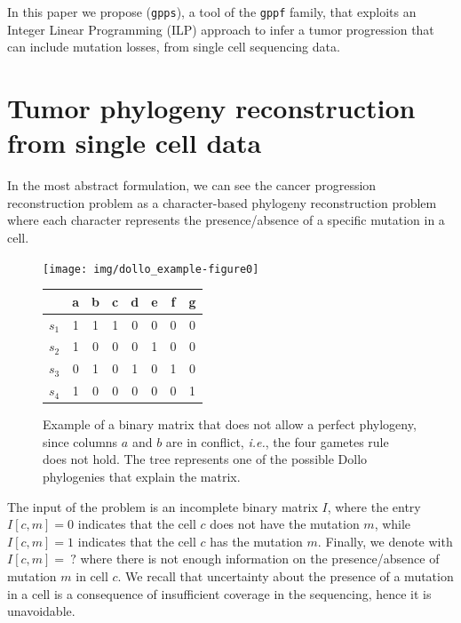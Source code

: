 \documentclass[a4paper,USenglish]{article}
\newcommand{\ie}{\emph{i.e.}}
\theoremstyle{definition}
\begin{document}
In this paper we propose (\texttt{gpps}), a tool of the \texttt{gppf}
family, that exploits an Integer Linear Programming (ILP) approach to
infer a tumor progression that can include mutation losses, from
single cell sequencing data.

\section{Tumor phylogeny reconstruction from single cell data}

In the most abstract formulation, we can see the cancer progression
reconstruction problem as a character-based phylogeny reconstruction
problem~\cite{Gusfield} where each character represents the
presence/absence of a specific mutation in a cell.

\begin{figure}[tb!]
  \begin{minipage}[c]{0.55\textwidth}
    \texttt{[image: img/dollo\_example-figure0]}
  \end{minipage}
  \begin{minipage}[t]{0.3\textwidth}
    \begin{tabular}[!t]{c|ccccccc}
      & a & b & c & d & e & f & g  \\ \hline
      $s_1$ & 1 & 1 & 1 & 0 & 0 & 0 & 0 \\
      $s_2$ & 1 & 0 & 0 & 0 & 1 & 0 & 0 \\
      $s_3$ & 0 & 1 & 0 & 1 & 0 & 1 & 0 \\
      $s_4$ & 1 & 0 & 0 & 0 & 0 & 0 & 1
    \end{tabular}
  \end{minipage}
  \caption{Example of a binary matrix that does not allow a perfect
    phylogeny, since columns $a$ and $b$ are in conflict, \ie, the
    four gametes rule~\cite{gusfield1991} does not hold. The tree
    represents one of the possible Dollo phylogenies that explain the
    matrix.}
  \label{fig:dollo}
\end{figure}

The input of the problem is an incomplete binary matrix $I$, where the
entry $I[c,m]=0$ indicates that the cell $c$ does not have the
mutation $m$, while $I[c,m]=1$ indicates that the cell $c$ has the
mutation $m$.  Finally, we denote with $I[c,m]=\ ?$ where there is not
enough information on the presence/absence of mutation $m$ in cell
$c$.  We recall that uncertainty about the presence of a mutation in a
cell is a consequence of insufficient coverage in the sequencing,
hence it is unavoidable.
\end{document}
